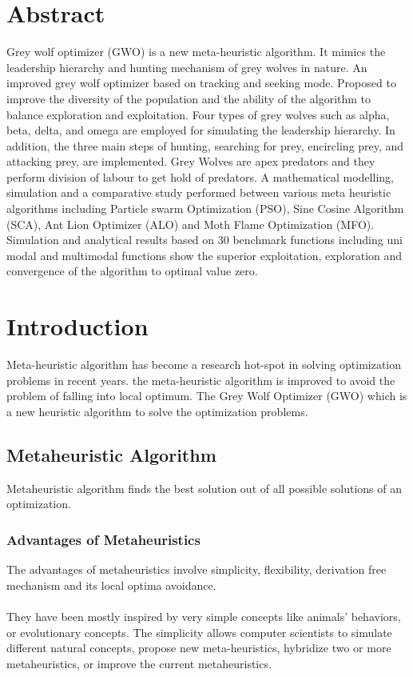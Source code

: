 \documentclass[11pt]{report}
\begin{document}
\clearpage

\chapter*{Abstract}
\doublespacing
{}
Grey wolf optimizer (GWO) is a new meta-heuristic algorithm. It mimics the leadership hierarchy and hunting mechanism of grey wolves in nature. An improved grey wolf optimizer based on tracking and seeking mode. Proposed to improve the diversity of the population and the ability of the algorithm to balance exploration and exploitation. Four  types  of  grey  wolves  such  as  alpha,  beta,  delta,  and  omega  are  employed  for  simulating  the 
leadership  hierarchy.  In  addition,  the  three  main  steps  of  hunting,  searching  for  prey,  encircling  prey,  and 
attacking prey, are implemented.
Grey Wolves are apex predators and they perform division of labour to get hold of predators. A mathematical modelling, simulation and a comparative study performed between various meta heuristic algorithms including Particle swarm Optimization (PSO), Sine Cosine Algorithm (SCA),  Ant Lion
Optimizer (ALO) and Moth Flame Optimization (MFO).
Simulation and analytical results based on 30 benchmark functions including uni modal and multimodal functions show the superior exploitation, exploration and convergence of the algorithm to optimal value zero.
\clearpage


\newpage
\doublespacing\tableofcontents
\listoffigures
\listoftables
\newpage
{}
\chapter{Introduction}
Meta-heuristic algorithm
has become a research hot-spot in solving optimization problems in recent years.  the meta-heuristic algorithm is improved to avoid the problem of falling into local
optimum. The Grey Wolf Optimizer (GWO) which is a new heuristic algorithm to solve
the optimization problems.

\section{Metaheuristic Algorithm}
Metaheuristic algorithm finds the best solution out of all possible solutions of an optimization.

 
\subsection{Advantages of Metaheuristics}
The advantages of metaheuristics involve simplicity, flexibility, derivation free mechanism and its local optima avoidance.\\
\\
They have been mostly inspired by very simple concepts like animals’ behaviors, or evolutionary concepts. The
simplicity allows computer scientists to simulate different natural concepts, propose new meta-heuristics, hybridize two or more metaheuristics, or improve the current metaheuristics.
\end{document}
